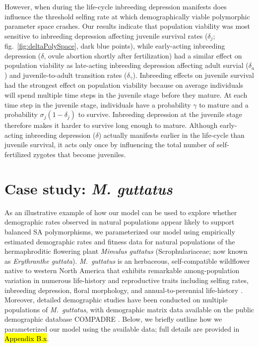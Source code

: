 \documentclass[11pt]{article}
\begin{document}
However, when during the life-cycle inbreeding depression manifests does influence the threshold selfing rate at which demographically viable polymorphic parameter space crashes. Our results indicate that population viability was most sensitive to inbreeding depression affecting juvenile survival rates ($\delta_j$; fig.~\ref{fig:deltaPolySpace}, dark blue points), while early-acting inbreeding depression ($\delta$, ovule abortion shortly after fertilization) had a similar effect on population viability as late-acting inbreeding depression affecting adult survial ($\delta_a$) and juvenile-to-adult transition rates ($\delta_{\gamma}$). Inbreeding effects on juvenile survival had the strongest effect on population viability because on average individuals will spend multiple time steps in the juvenile stage before they mature. At each time step in the juvenile stage, individuals have a probability $\gamma$ to mature and a probability $\sigma_j(1-\delta_j)$ to survive. Inbreeding depression at the juvenile stage therefore makes it harder to survive long enough to mature. Although early-acting inbreeding depression ($\delta$) actually manifests earlier in the life-cycle than juvenile survival, it acts only once by influencing the total number of self-fertilized zygotes that become juveniles.


\section{Case study: {\itshape M. guttatus}}


As an illustrative example of how our model can be used to explore whether demographic rates observed in natural populations appear likely to support balanced SA polymorphisms, we parameterized our model using empirically estimated demographic rates and fitness data for natural populations of the hermaphroditic flowering plant {\itshape Mimulus guttatus} (Scrophulariaceae; now known as {\itshape Erythranthe guttata}). {\itshape M.~guttatus} is an herbaceous, self-compatible wildflower native to western North America that exhibits remarkable among-population variation in numerous life-history and reproductive traits including selfing rates, inbreeding depression, floral morphology, and annual-to-perennial life-history \citep[e.g.,][]{RitlandGanders1987, Ritland1990, Willis1993, Willis1999a, Willis1999b, WuWillis2008}. Moreover, detailed demographic studies have been conducted on multiple populations of {\itshape M.~guttatus}, with demographic matrix data available on the public demographic database COMPADRE \citep{CompadreDB2020}. Below, we briefly outline how we parameterized our model using the available data; full details are provided in \hl{Appendix B.x}.
\end{document}
